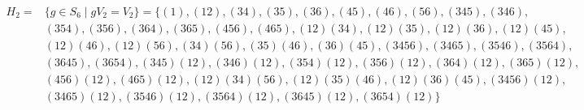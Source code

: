 \documentclass[12pt]{book}
\theoremstyle{definition}
\newcounter{in}
\begin{document}
\begin{footnotesize}
  \begin{align*}
    H_{2}=&\{g\in S_{6}\mid
    gV_{2}=V_{2}\}=\{(1),(12),(34),(35),(36),(45),(46),(56),(345),(346),\\
    &(354),(356),(364),(365),(456),(465),(12)(34),(12)(35),(12)(36),(12)(45),\\
    &(12)(46),(12)(56),(34)(56),(35)(46),(36)(45),(3456),(3465),(3546),(3564),\\
    &(3645),(3654),(345)(12),(346)(12),(354)(12),(356)(12),(364)(12),(365)(12),\\
    &(456)(12),(465)(12),(12)(34)(56),(12)(35)(46),(12)(36)(45),(3456)(12),\\
    &(3465)(12),(3546)(12),(3564)(12),(3645)(12),(3654)(12)\}
  \end{align*}
\end{footnotesize}

\begin{table}[!hbtp]
  \centering

\caption{Caracteres de $S_{6}$ restringidos a $H_{2}$ y carácter de $V_{2}$}
\label{tab:clanes-H_2-6}
\end{table}
\end{document}
